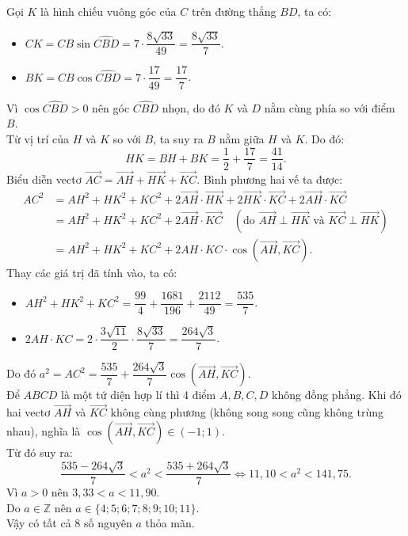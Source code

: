 \begin{ex}
{		Gọi $K$ là hình chiếu vuông góc của $C$ trên đường thẳng $BD$, ta có:
		\begin{itemize}
			\item $CK = CB \sin \widehat{CBD} = 7 \cdot \dfrac{8\sqrt{33}}{49} = \dfrac{8\sqrt{33}}{7}$.
			\item $BK = CB \cos \widehat{CBD} = 7 \cdot \dfrac{17}{49} = \dfrac{17}{7}$.
		\end{itemize}
		Vì $\cos \widehat{CBD} > 0$ nên góc $\widehat{CBD}$ nhọn, do đó $K$ và $D$ nằm cùng phía so với điểm $B$.\\
		Từ vị trí của $H$ và $K$ so với $B$, ta suy ra $B$ nằm giữa $H$ và $K$. Do đó:
		\[ HK = BH + BK = \dfrac{1}{2} + \dfrac{17}{7} = \dfrac{41}{14}. \]
		Biểu diễn vectơ $\overrightarrow{AC} = \overrightarrow{AH} + \overrightarrow{HK} + \overrightarrow{KC}$. Bình phương hai vế ta được:
		\allowdisplaybreaks
		\begin{align*}
			AC^2 &= AH^2 + HK^2 + KC^2 + 2\overrightarrow{AH}\cdot\overrightarrow{HK} + 2\overrightarrow{HK}\cdot\overrightarrow{KC} + 2\overrightarrow{AH}\cdot\overrightarrow{KC} \\
			&= AH^2 + HK^2 + KC^2 + 2\overrightarrow{AH}\cdot\overrightarrow{KC} \quad (\text{do } \overrightarrow{AH} \perp \overrightarrow{HK} \text{ và } \overrightarrow{KC} \perp \overrightarrow{HK}) \\
			&= AH^2 + HK^2 + KC^2 + 2 AH \cdot KC \cdot \cos(\overrightarrow{AH}, \overrightarrow{KC}).
		\end{align*}
		Thay các giá trị đã tính vào, ta có:
		\begin{itemize}
			\item $AH^2 + HK^2 + KC^2 = \dfrac{99}{4} + \dfrac{1681}{196} + \dfrac{2112}{49} = \dfrac{535}{7}$.
			\item $2 AH \cdot KC = 2 \cdot \dfrac{3\sqrt{11}}{2} \cdot \dfrac{8\sqrt{33}}{7} = \dfrac{264\sqrt{3}}{7}$.
		\end{itemize}
		Do đó $a^2 = AC^2 = \dfrac{535}{7} + \dfrac{264\sqrt{3}}{7} \cos(\overrightarrow{AH}, \overrightarrow{KC})$.\\
		Để $ABCD$ là một tứ diện hợp lí thì 4 điểm $A, B, C, D$ không đồng phẳng. Khi đó hai vectơ $\overrightarrow{AH}$ và $\overrightarrow{KC}$ không cùng phương (không song song cũng không trùng nhau), nghĩa là $\cos(\overrightarrow{AH}, \overrightarrow{KC}) \in (-1; 1)$.\\
		Từ đó suy ra:
		\[ \dfrac{535 - 264\sqrt{3}}{7} < a^2 < \dfrac{535 + 264\sqrt{3}}{7} \Leftrightarrow 11{,}10 < a^2 < 141{,}75. \]
		Vì $a > 0$ nên $3{,}33 < a < 11{,}90$.\\
		Do $a \in \mathbb{Z}$ nên $a \in \{4; 5; 6; 7; 8; 9; 10; 11\}$.\\
		Vậy có tất cả $8$ số nguyên $a$ thỏa mãn.
	}
\end{ex}



